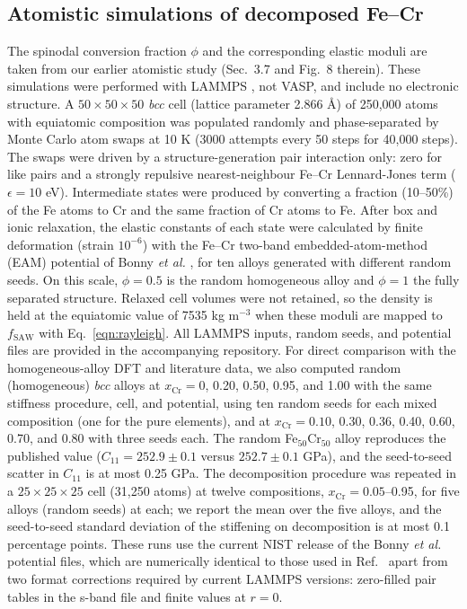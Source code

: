 \documentclass[final,3p,times]{elsarticle}
\begin{document}
\subsection{Atomistic simulations of decomposed Fe--Cr}
\label{sec:md}
The spinodal conversion fraction $\phi$ and the corresponding elastic moduli are taken from our earlier atomistic study \cite{al2023detecting} (Sec.~3.7 and Fig.~8 therein). These simulations were performed with LAMMPS \cite{plimpton1995}, not VASP, and include no electronic structure. A $50\times50\times50$ \textit{bcc} cell (lattice parameter 2.866 \AA) of 250,000 atoms with equiatomic composition was populated randomly and phase-separated by Monte Carlo atom swaps at 10 K (3000 attempts every 50 steps for 40,000 steps). The swaps were driven by a structure-generation pair interaction only: zero for like pairs and a strongly repulsive nearest-neighbour Fe--Cr Lennard-Jones term ($\epsilon=10$ eV). Intermediate states were produced by converting a fraction (10--50\%) of the Fe atoms to Cr and the same fraction of Cr atoms to Fe. After box and ionic relaxation, the elastic constants of each state were calculated by finite deformation (strain $10^{-6}$) with the Fe--Cr two-band embedded-atom-method (EAM) potential of Bonny \textit{et al.} \cite{bonny2011iron}, for ten alloys generated with different random seeds. On this scale, $\phi=0.5$ is the random homogeneous alloy and $\phi=1$ the fully separated structure. Relaxed cell volumes were not retained, so the density is held at the equiatomic value of 7535 kg m$^{-3}$ when these moduli are mapped to $f_{\mathrm{SAW}}$ with Eq.~\ref{eqn:rayleigh}. All LAMMPS inputs, random seeds, and potential files are provided in the accompanying repository. For direct comparison with the homogeneous-alloy DFT and literature data, we also computed random (homogeneous) \textit{bcc} alloys at $x_{\mathrm{Cr}}=0$, 0.20, 0.50, 0.95, and 1.00 with the same stiffness procedure, cell, and potential, using ten random seeds for each mixed composition (one for the pure elements), and at $x_{\mathrm{Cr}}=0.10$, 0.30, 0.36, 0.40, 0.60, 0.70, and 0.80 with three seeds each. The random Fe$_{50}$Cr$_{50}$ alloy reproduces the published value ($C_{11}=252.9\pm0.1$ versus $252.7\pm0.1$ GPa), and the seed-to-seed scatter in $C_{11}$ is at most 0.25 GPa. The decomposition procedure was repeated in a $25\times25\times25$ cell (31,250 atoms) at twelve compositions, $x_{\mathrm{Cr}}=0.05$--0.95, for five alloys (random seeds) at each; we report the mean over the five alloys, and the seed-to-seed standard deviation of the stiffening on decomposition is at most 0.1 percentage points. These runs use the current NIST release of the Bonny \textit{et al.} potential files, which are numerically identical to those used in Ref.~\cite{al2023detecting} apart from two format corrections required by current LAMMPS versions: zero-filled pair tables in the s-band file and finite values at $r=0$.
\end{document}
